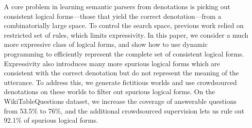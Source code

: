 A core problem in learning semantic parsers from denotations is picking out consistent logical forms---those that yield the correct denotation---from a combinatorially large space. To control the search space, previous work relied on restricted set of rules, which limits expressivity. In this paper, we consider a much more expressive class of logical forms, and show how to use dynamic programming to efficiently represent the complete set of consistent logical forms. Expressivity also introduces many more spurious logical forms which are consistent with the correct denotation but do not represent the meaning of the utterance. To address this, we generate fictitious worlds and use crowdsourced denotations on these worlds to filter out spurious logical forms. On the WikiTableQuestions dataset, we increase the coverage of answerable questions from 53.5\% to 76\%, and the additional crowdsourced supervision lets us rule out 92.1\% of spurious logical forms.
